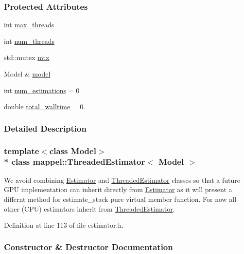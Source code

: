\subsubsection*{Protected Attributes}
\begin{DoxyCompactItemize}
\item 
int \hyperlink{classmappel_1_1ThreadedEstimator_a31391f8aaab3484f58bfdedbdb22be42}{max\+\_\+threads}
\item 
int \hyperlink{classmappel_1_1ThreadedEstimator_a6afa05d7d971f3317ce1602de853123b}{num\+\_\+threads}
\item 
std\+::mutex \hyperlink{classmappel_1_1ThreadedEstimator_a4538fd0860243430bfd47e8064c8cfe4}{mtx}
\item 
Model \& \hyperlink{classmappel_1_1Estimator_a8322546d87ccdf01f8b0dcd9dae509f0}{model}
\item 
int \hyperlink{classmappel_1_1Estimator_ab15b88435d6c50a68fac84465d950b12}{num\+\_\+estimations} = 0
\item 
double \hyperlink{classmappel_1_1Estimator_a5a408458a111c5222193871fa6bb6644}{total\+\_\+walltime} = 0.
\end{DoxyCompactItemize}


\subsubsection{Detailed Description}
\subsubsection*{template$<$class Model$>$\\*
class mappel\+::\+Threaded\+Estimator$<$ Model $>$}

We avoid combining \hyperlink{classmappel_1_1Estimator}{Estimator} and \hyperlink{classmappel_1_1ThreadedEstimator}{Threaded\+Estimator} classes so that a future G\+PU implementation can inherit directly from \hyperlink{classmappel_1_1Estimator}{Estimator} as it will present a differnt method for estimate\+\_\+stack pure virtual member function. For now all other (C\+PU) estimators inherit from \hyperlink{classmappel_1_1ThreadedEstimator}{Threaded\+Estimator}. 

Definition at line 113 of file estimator.\+h.



\subsubsection{Constructor \& Destructor Documentation}
